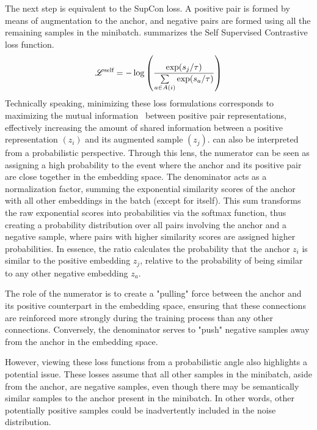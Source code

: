 The next step is equivalent to the SupCon loss. A positive pair is formed by
means of augmentation to the anchor, and negative pairs are formed using all the
remaining samples in the minibatch.  summarizes the Self Supervised
Contrastive loss function.
\begin{equation}
    \labeq{4_2}
    \mathscr{L}^{\text{self}} = - \log \left(
        \frac
        {\exp(s_j / \tau)}
        {\sum\limits_{a \in A(i)} \exp(s_a / \tau)}
    \right)
\end{equation}
Technically speaking, minimizing these loss formulations corresponds to
maximizing the mutual information~\cite{aaron_representation_2018} between
positive pair representations, effectively increasing the amount of shared
information between a positive representation $(z_i)$ and its augmented sample
$(z_j)$.  can also be interpreted from a probabilistic perspective.
Through this lens, the numerator can be seen as assigning a high probability to
the event where the anchor and its positive pair are close together in the
embedding space. The denominator acts as a normalization factor, summing the
exponential similarity scores of the anchor with all other embeddings in the
batch (except for itself). This sum transforms the raw exponential scores into
probabilities via the softmax function, thus creating a probability
distribution over all pairs involving the anchor and a
negative sample, where pairs with higher similarity scores are assigned higher
probabilities. In essence, the ratio calculates the probability that the anchor
$z_i$ is similar to the positive embedding $z_j$, relative to the probability of
being similar to any other negative embedding $z_a$.

The role of the numerator is to create a "pulling" force between the anchor and
its positive counterpart in the embedding space, ensuring that these connections
are reinforced more strongly during the training process than any other
connections. Conversely, the denominator serves to "push" negative samples away
from the anchor in the embedding space.

However, viewing these loss functions from a probabilistic angle also highlights
a potential issue. These losses assume that all other samples in the minibatch,
aside from the anchor, are negative samples, even though there may be
semantically similar samples to the anchor present in the minibatch. In other
words, other potentially positive samples could be inadvertently included in the
noise distribution.

